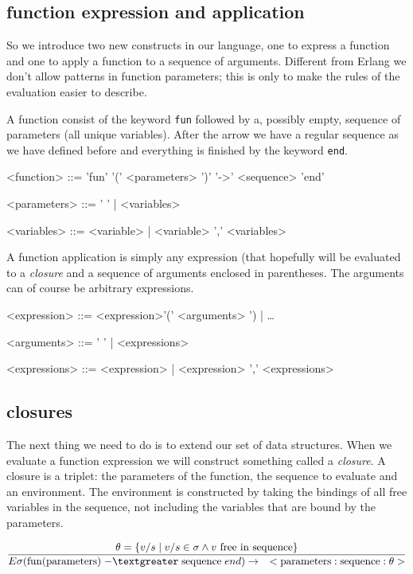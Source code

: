\documentclass[a4paper,11pt]{article}
\begin{document}
\subsection{function expression and application}

So we introduce two new constructs in our language, one to express a
function and one to apply a function to a sequence of
arguments. Different from Erlang we don't allow patterns in function
parameters; this is only to make the rules of the evaluation easier to
describe.

A function consist of the keyword {\tt fun} followed by a, possibly
empty, sequence of parameters (all unique variables). After the arrow
we have a regular sequence as we have defined before and everything is
finished by the keyword {\tt end}.

\begin{grammar}
<function> ::= 'fun' '(' <parameters> ')' '-\textgreater' <sequence> 'end'

<parameters> ::= ' ' | <variables> 

<variables> ::= <variable> |  <variable> ',' <variables>
\end{grammar}

A function application is simply any expression (that hopefully will
be evaluated to a {\em closure} and a sequence of arguments enclosed
in parentheses. The arguments can of course be arbitrary expressions.

\begin{grammar}
<expression> ::=  <expression>'(' <arguments> ') | \ldots 

<arguments> ::= '  ' | <expressions> 

<expressions> ::= <expression> | <expression> ',' <expressions>
\end{grammar}

\subsection{closures}

The next thing we need to do is to extend our set of data
structures. When we evaluate a function expression we will construct
something called a {\em closure}. A closure is a triplet: the parameters
of the function, the sequence to evaluate and an environment. The
environment is constructed by taking the bindings of all free
variables in the sequence, not including the variables that are bound
by the parameters.

$$\frac{ \theta = \{ v/s \mid  v/s \in \sigma \wedge v {\rm\ free\  in\ sequence}\}}{
E\sigma({\rm fun}({\rm parameters})\; {\rm -\textgreater}\; {\rm sequence}\; end) \rightarrow  \quad <{\rm parameters}:{\rm sequence}:\theta>}$$
\end{document}

